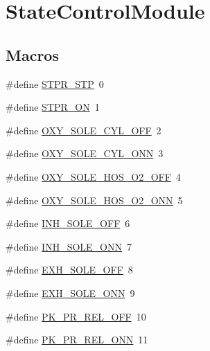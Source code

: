 \hypertarget{group___state_control_module}{}\section{State\+Control\+Module}
\label{group___state_control_module}
\subsection*{Macros}
\begin{DoxyCompactItemize}
\item 
\#define \hyperlink{group___state_control_module_gab30c6a2146e6fae222d0b331a2a42962}{S\+T\+P\+R\+\_\+\+S\+TP}~0
\item 
\#define \hyperlink{group___state_control_module_gab4744223ea2ca17d02a56720bec5d254}{S\+T\+P\+R\+\_\+\+ON}~1
\item 
\#define \hyperlink{group___state_control_module_ga97deb11039270c5b73a5636d30f95758}{O\+X\+Y\+\_\+\+S\+O\+L\+E\+\_\+\+C\+Y\+L\+\_\+\+O\+FF}~2
\item 
\#define \hyperlink{group___state_control_module_ga415db3daa54c51ab66cbec2891d7bbcf}{O\+X\+Y\+\_\+\+S\+O\+L\+E\+\_\+\+C\+Y\+L\+\_\+\+O\+NN}~3
\item 
\#define \hyperlink{group___state_control_module_ga2b3bdf8e49d8ad48918a8bf63a65a48b}{O\+X\+Y\+\_\+\+S\+O\+L\+E\+\_\+\+H\+O\+S\+\_\+\+O2\+\_\+\+O\+FF}~4
\item 
\#define \hyperlink{group___state_control_module_ga502fb88a7511892493a5447107597f75}{O\+X\+Y\+\_\+\+S\+O\+L\+E\+\_\+\+H\+O\+S\+\_\+\+O2\+\_\+\+O\+NN}~5
\item 
\#define \hyperlink{group___state_control_module_gaf489570cc78286bb317a2a8a98dade60}{I\+N\+H\+\_\+\+S\+O\+L\+E\+\_\+\+O\+FF}~6
\item 
\#define \hyperlink{group___state_control_module_ga93f66e0e218ae8a864722e870d6eb97a}{I\+N\+H\+\_\+\+S\+O\+L\+E\+\_\+\+O\+NN}~7
\item 
\#define \hyperlink{group___state_control_module_ga10a53a2718979d3636a57d6662b5be1d}{E\+X\+H\+\_\+\+S\+O\+L\+E\+\_\+\+O\+FF}~8
\item 
\#define \hyperlink{group___state_control_module_gadabe6f4d8f03ec2e22d4f980cdc67462}{E\+X\+H\+\_\+\+S\+O\+L\+E\+\_\+\+O\+NN}~9
\item 
\#define \hyperlink{group___state_control_module_gab2ee9632e3286d4a14984763103b695f}{P\+K\+\_\+\+P\+R\+\_\+\+R\+E\+L\+\_\+\+O\+FF}~10
\item 
\#define \hyperlink{group___state_control_module_gab999c8291a101c0bcd63a90989fdcd6f}{P\+K\+\_\+\+P\+R\+\_\+\+R\+E\+L\+\_\+\+O\+NN}~11

\end{DoxyCompactItemize}
